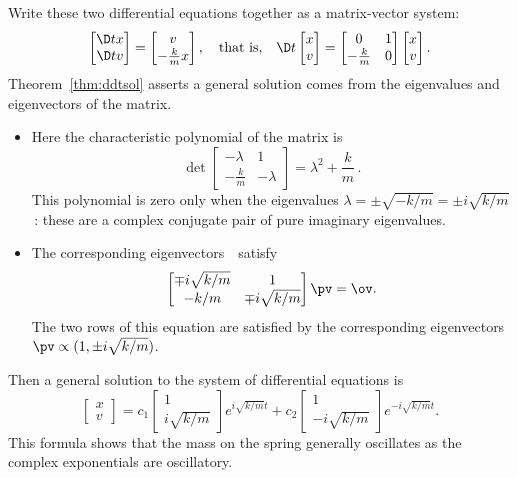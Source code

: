 \begin{example}
\begin{solution}
Write these two differential equations together as a matrix-vector system: 
\begin{equation*}
\begin{bmatrix} \D tx\\\D tv \end{bmatrix}
=\begin{bmatrix} v\\-\frac kmx \end{bmatrix},
\quad\text{that is,}\quad
\D t{}\begin{bmatrix} x\\v \end{bmatrix}
=\begin{bmatrix} 0&1\\-\frac km&0 \end{bmatrix}\begin{bmatrix} x\\v \end{bmatrix}.
\end{equation*}
Theorem~\ref{thm:ddtsol} asserts a general solution comes from the eigenvalues and eigenvectors of the matrix.
\begin{itemize}
\item Here the characteristic polynomial of the matrix is
\begin{equation*}
\det\begin{bmatrix} -\lambda&1\\-\frac km&-\lambda \end{bmatrix}
=\lambda^2+\frac km\,.
\end{equation*}
This polynomial is zero only when the eigenvalues \(\lambda=\pm\sqrt{-k/m}=\pm i\sqrt{k/m}\)\,: these are a complex conjugate pair of pure imaginary eigenvalues.

\item  The corresponding eigenvectors~\pv\ satisfy
\begin{equation*}
\begin{bmatrix} \mp i\sqrt{k/m}&1\\- k/m&\mp i\sqrt{k/m} \end{bmatrix}
\pv=\ov.
\end{equation*}
The two rows of this equation are satisfied by the corresponding eigenvectors \(\pv\propto (1,\pm i\sqrt{k/m})\).
\end{itemize}
Then a general solution to the system of differential equations is
\begin{equation*}
\begin{bmatrix} x\\v \end{bmatrix}
=c_1\begin{bmatrix} 1\\i\sqrt{k/m} \end{bmatrix}e^{i\sqrt{k/m}t}
+c_2\begin{bmatrix} 1\\-i\sqrt{k/m} \end{bmatrix}e^{-i\sqrt{k/m}t}.
\end{equation*}
This formula shows that the mass on the spring generally oscillates as the complex exponentials are oscillatory.


\end{solution}
\end{example}
